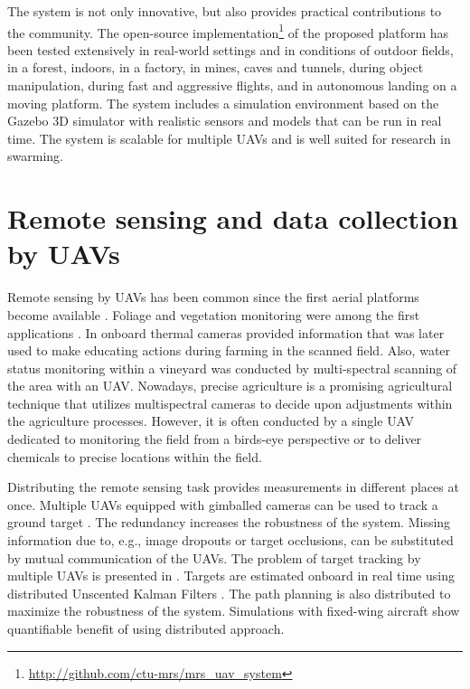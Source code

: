 \documentclass[a4paper,11pt,titlepage,twoside]{book}
\begin{document}
The system is not only innovative, but also provides practical contributions to the community.
The open-source implementation\footnote{\url{http://github.com/ctu-mrs/mrs_uav_system}} of the proposed platform has been tested extensively in real-world settings and in conditions of outdoor fields, in a forest, indoors, in a factory, in mines, caves and tunnels, during object manipulation, during fast and aggressive flights, and in autonomous landing on a moving platform.
The system includes a simulation environment based on the Gazebo 3D simulator with realistic sensors and models that can be run in real time.
The system is scalable for multiple \acp{UAV} and is well suited for research in swarming.



\section{Remote sensing and data collection by UAVs}

Remote sensing by \acp{UAV} has been common since the first aerial platforms become available \cite{colomina2014unmanned, pajares2015overview}.
Foliage and vegetation monitoring were among the first applications \cite{barrientos2011aerial}.
In \cite{berni2009thermal} onboard thermal cameras provided information that was later used to make educating actions during farming in the scanned field.
Also, water status monitoring within a vineyard \cite{baluja2012assessment} was conducted by multi-spectral scanning of the area with an \ac{UAV}.
Nowadays, precise agriculture is a promising agricultural technique that utilizes multispectral cameras to decide upon adjustments within the agriculture processes.
However, it is often conducted by a single \ac{UAV} dedicated to monitoring the field from a birds-eye perspective or to deliver chemicals to precise locations within the field.

Distributing the remote sensing task provides measurements in different places at once.
Multiple UAVs equipped with gimballed cameras can be used to track a ground target \cite{sun2014distributed}.
The redundancy increases the robustness of the system.
Missing information due to, e.g., image dropouts or target occlusions, can be substituted by mutual communication of the \acp{UAV}.
The problem of target tracking by multiple \acp{UAV} is presented in \cite{farmani2015tracking}.
Targets are estimated onboard in real time using distributed Unscented Kalman Filters \cite{wan2000unscented}.
The path planning is also distributed to maximize the robustness of the system.
Simulations with fixed-wing aircraft show quantifiable benefit of using distributed approach.
\end{document}
